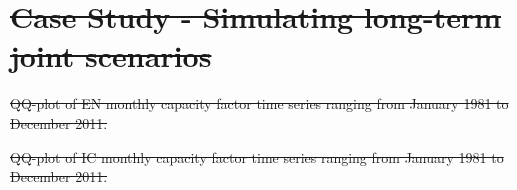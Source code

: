 \documentclass[a4paper]{IEEEtran}
\providecommand{\DIFdel}[1]{{\protect\color{red}\sout{#1}}}                      %
\providecommand{\DIFdelbegin}{} %
\providecommand{\DIFdelend}{} %
\begin{document}

\DIFdelbegin \section{\DIFdel{Case Study - Simulating long-term joint scenarios}} %
\addtocounter{section}{-1}%
\DIFdelend %

\DIFdelbegin %
{%
\DIFdel{QQ-plot of EN monthly capacity factor time series ranging from January 1981 to December 2011.}}
\DIFdelend %

\DIFdelbegin %
{%
\DIFdel{QQ-plot of IC monthly capacity factor time series ranging from January 1981 to December 2011.}}
\DIFdelend %
\end{document}
